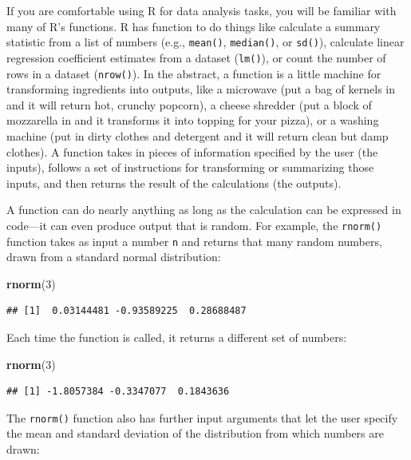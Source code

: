 \documentclass[
]{book}
\newenvironment{Shaded}{\begin{snugshade}}{\end{snugshade}}
\newcommand{\DecValTok}[1]{\textcolor[rgb]{0.00,0.00,0.81}{#1}}
\newcommand{\FunctionTok}[1]{\textcolor[rgb]{0.13,0.29,0.53}{\textbf{#1}}}
\newcommand{\NormalTok}[1]{#1}
\begin{document}
If you are comfortable using R for data analysis tasks, you will be familiar with many of R's functions.
R has function to do things like calculate a summary statistic from a list of numbers (e.g., \texttt{mean()}, \texttt{median()}, or \texttt{sd()}), calculate linear regression coefficient estimates from a dataset (\texttt{lm()}), or count the number of rows in a dataset (\texttt{nrow()}).
In the abstract, a function is a little machine for transforming ingredients into outputs, like a microwave (put a bag of kernels in and it will return hot, crunchy popcorn), a cheese shredder (put a block of mozzarella in and it transforms it into topping for your pizza), or a washing machine (put in dirty clothes and detergent and it will return clean but damp clothes).
A function takes in pieces of information specified by the user (the inputs), follows a set of instructions for transforming or summarizing those inputs, and then returns the result of the calculations (the outputs).

A function can do nearly anything as long as the calculation can be expressed in code---it can even produce output that is random.
For example, the \texttt{rnorm()} function takes as input a number \texttt{n} and returns that many random numbers, drawn from a standard normal distribution:

\begin{Shaded}
\begin{Highlighting}[]
\FunctionTok{rnorm}\NormalTok{(}\DecValTok{3}\NormalTok{)}
\end{Highlighting}
\end{Shaded}

\begin{verbatim}
## [1]  0.03144481 -0.93589225  0.28688487
\end{verbatim}

Each time the function is called, it returns a different set of numbers:

\begin{Shaded}
\begin{Highlighting}[]
\FunctionTok{rnorm}\NormalTok{(}\DecValTok{3}\NormalTok{)}
\end{Highlighting}
\end{Shaded}

\begin{verbatim}
## [1] -1.8057384 -0.3347077  0.1843636
\end{verbatim}

The \texttt{rnorm()} function also has further input arguments that let the user specify the mean and standard deviation of the distribution from which numbers are drawn:
\end{document}

